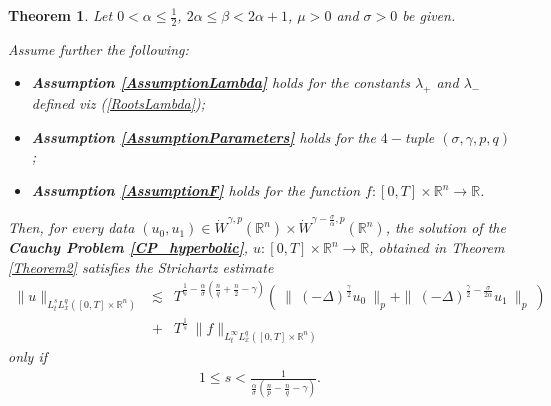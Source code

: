 \documentclass{amsart}
\newtheorem{theorem}{Theorem}[section]
\theoremstyle{definition}
\theoremstyle{remark}
\numberwithin{equation}{section}
\newcommand{\BR}{{\mathbb R}}
\begin{document}
		\begin{theorem}\label{Theorem2Strichartz}
			Let $0<\alpha\leq \frac{1}{2}$, $2\alpha\leq \beta< 2\alpha+1$, $\mu>0$ and $\sigma>0$ be given.
			
			Assume further the following:
			\begin{itemize}
				\item {\bf Assumption \ref{AssumptionLambda}} holds for the constants $\lambda_+$ and $\lambda_-$ defined viz (\ref{RootsLambda});
				\item {\bf Assumption \ref{AssumptionParameters}} holds for the $4-$tuple $(\sigma,\gamma,p,q)$;
				\item {\bf Assumption \ref{AssumptionF}} holds for the function $f:[0,T]\times \BR^n\longrightarrow \BR$.
			\end{itemize}
			
			Then, for every data $(u_0,u_1)\in \dot{W}^{\gamma,p}(\BR^n)\times\dot{W}^{\gamma-\frac{\sigma}{\alpha},p}(\BR^n)$, the solution of the {\bf Cauchy Problem \ref{CP_hyperbolic}}, $u:[0,T]\times \BR^n\longrightarrow \BR$, obtained in Theorem \ref{Theorem2} satisfies the Strichartz estimate
			\begin{eqnarray*}
				\|u\|_{L^s_tL^q_x\left([0,T]\times\BR^n\right)}&\lesssim& T^{\frac{1}{s}-\frac{\alpha}{\sigma}\left(\frac{n}{q}+\frac{n}{2}-\gamma \right)}
				\left(~\|~(-\Delta)^{\frac{\gamma}{2}} u_0~\|_{p}+\|~(-\Delta)^{\frac{\gamma}{2}-\frac{\sigma}{2\alpha}} u_1~\|_{p}~\right)\\
				&+& T^{\frac{1}{s}}~\|f\|_{L^\infty_tL^q_x\left([0,T]\times\BR^n\right)}
			\end{eqnarray*}
			only if
			\begin{eqnarray}
				\label{MixedNormConstraintB}
				1\leq s<\frac{1}{\frac{\alpha}{\sigma}\left(\frac{n}{p}-\frac{n}{q}-\gamma\right)}.
			\end{eqnarray}
		\end{theorem}
		
\end{document}
